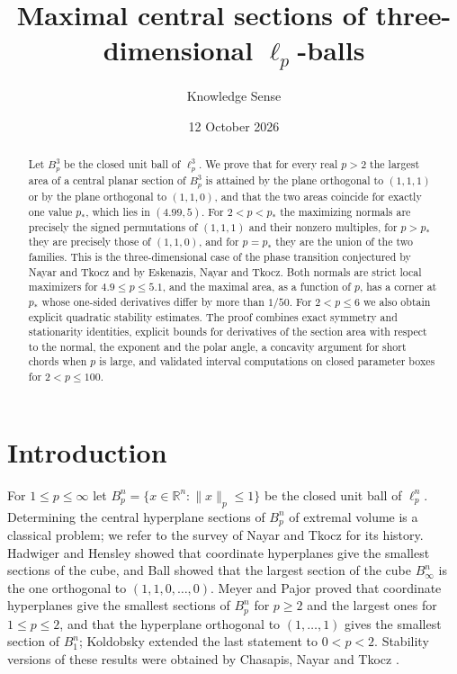 \documentclass[11pt]{amsart}
\theoremstyle{definition}
\theoremstyle{remark}
\numberwithin{equation}{section}
\newcommand{\R}{\mathbb{R}}
\begin{document}
\title{Maximal central sections of three-dimensional $\ell_p$-balls}
\author{Knowledge Sense}
\address{Knowledge Sense}
\date{12 October 2026}

\begin{abstract}
Let $B_p^3$ be the closed unit ball of $\ell_p^3$. We prove that for every real $p>2$ the largest area of a central planar section of $B_p^3$ is attained by the plane orthogonal to $(1,1,1)$ or by the plane orthogonal to $(1,1,0)$, and that the two areas coincide for exactly one value $p_*$, which lies in $(4.99,5)$. For $2<p<p_*$ the maximizing normals are precisely the signed permutations of $(1,1,1)$ and their nonzero multiples, for $p>p_*$ they are precisely those of $(1,1,0)$, and for $p=p_*$ they are the union of the two families. This is the three-dimensional case of the phase transition conjectured by Nayar and Tkocz and by Eskenazis, Nayar and Tkocz. Both normals are strict local maximizers for $4.9\le p\le 5.1$, and the maximal area, as a function of $p$, has a corner at $p_*$ whose one-sided derivatives differ by more than $1/50$. For $2<p\le 6$ we also obtain explicit quadratic stability estimates. The proof combines exact symmetry and stationarity identities, explicit bounds for derivatives of the section area with respect to the normal, the exponent and the polar angle, a concavity argument for short chords when $p$ is large, and validated interval computations on closed parameter boxes for $2<p\le 100$.
\end{abstract}

\maketitle

\section{Introduction}

For $1\le p\le\infty$ let $B_p^n=\{x\in\R^n:\|x\|_p\le 1\}$ be the closed unit ball of $\ell_p^n$. Determining the central hyperplane sections of $B_p^n$ of extremal volume is a classical problem; we refer to the survey of Nayar and Tkocz \cite{NT} for its history. Hadwiger \cite{Had} and Hensley \cite{Hen} showed that coordinate hyperplanes give the smallest sections of the cube, and Ball \cite{Ball} showed that the largest section of the cube $B_\infty^n$ is the one orthogonal to $(1,1,0,\dots,0)$. Meyer and Pajor \cite{MP} proved that coordinate hyperplanes give the smallest sections of $B_p^n$ for $p\ge 2$ and the largest ones for $1\le p\le 2$, and that the hyperplane orthogonal to $(1,\dots,1)$ gives the smallest section of $B_1^n$; Koldobsky \cite{Kol} extended the last statement to $0<p<2$. Stability versions of these results were obtained by Chasapis, Nayar and Tkocz \cite{CNT}.
\end{document}

